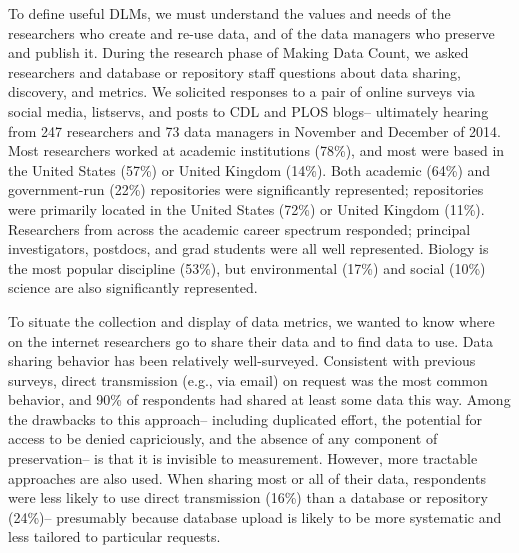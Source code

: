 \documentclass[english]{article}
\begin{document}
To define useful DLMs, we must understand the values and needs of the researchers who create and re-use data, and of the data managers who preserve and publish it.
During the research phase of Making Data Count, we asked researchers and database or repository staff questions about data sharing, discovery, and metrics.
We solicited responses to a pair of online surveys via social media, listservs, and posts to CDL and PLOS blogs-- ultimately hearing from 247 researchers and 73 data managers in November and December of 2014.
Most researchers worked at academic institutions (78\%), and most were based in the United States (57\%) or United Kingdom (14\%).
Both academic (64\%) and government-run (22\%) repositories were significantly represented; repositories were primarily located in the United States (72\%) or United Kingdom (11\%).
Researchers from across the academic career spectrum responded; principal investigators, postdocs, and grad students were all well represented. 
Biology is the most popular discipline (53\%), but environmental (17\%) and social (10\%) science are also significantly represented. 


To situate the collection and display of data metrics, we wanted to know where on the internet researchers go to share their data and to find data to use. 
Data sharing behavior has been relatively well-surveyed\cite{@tenopir_data_2011, @akers_disciplinary_2013, @wallis_if_2013, @aydinoglu_data_2014, @kratz_researcher_2015}. 
Consistent with previous surveys, direct transmission (e.g., via email) on request was the most common behavior, and 90\% of respondents had shared at least some data this way.
Among the drawbacks to this approach– including duplicated effort, the potential for access to be denied capriciously, and the absence of any component of preservation– is that it is invisible to measurement. 
However, more tractable approaches are also used.
When sharing most or all of their data, respondents were less likely to use direct transmission (16\%) than a database or repository (24\%)-- presumably because database upload is likely to be more systematic and less tailored to particular requests.
\end{document}
